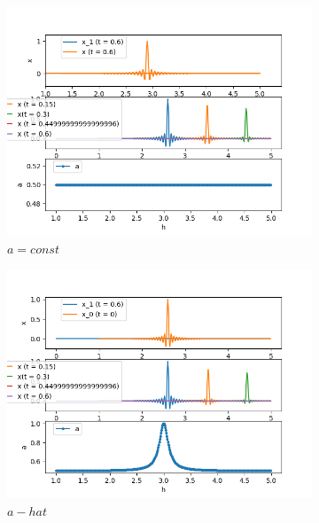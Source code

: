 \documentclass{article}
\begin{document}
\begin{figure}[h]
    \caption{Пик}
    \begin{subfigure}{0.33\textwidth}
    {\includegraphics[width=1\linewidth]{tests_bcomp/a_const_x0_peak.png} \\$a=const$}
    \end{subfigure}
    \begin{subfigure}{0.33\textwidth}
    {\includegraphics[width=1\linewidth]{tests_bcomp/a_hat_x0_peak.png} \\$a - hat$}
    \end{subfigure}
    \begin{subfigure}{0.33\textwidth}

\end{subfigure}
\end{figure}
\end{document}
